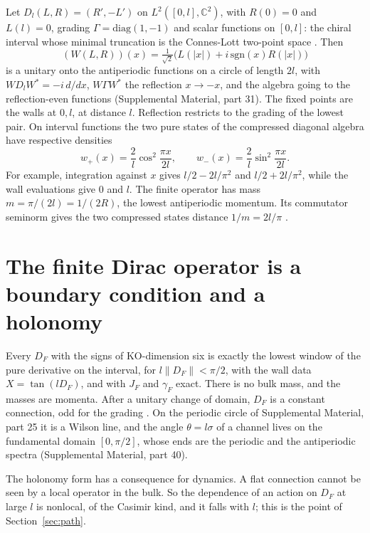 \documentclass[aps,prd,reprint,onecolumn,nofootinbib,amsmath,amssymb,floatfix]{revtex4-2}
\theoremstyle{plain}
\newcommand{\C}{\mathbb C}
\newcommand{\supp}[1]{Supplemental Material, part #1}
\begin{document}
Let $D_l(L,R)=(R',-L')$ on $L^2([0,l],\C^2)$, with $R(0)=0$ and $L(l)=0$, grading $\Gamma=\mathrm{diag}(1,-1)$ and scalar functions on $[0,l]$: the chiral interval whose minimal truncation is the Connes-Lott two-point space \cite{ConnesLott1991}. Then
\begin{equation}
(W(L,R))(x)=\tfrac1{\sqrt2}\bigl(L(|x|)+i\,\mathrm{sgn}(x)R(|x|)\bigr)
\end{equation}
is a unitary onto the antiperiodic functions on a circle of length $2l$, with $WD_lW^*=-i\,d/dx$, $W\Gamma W^*$ the reflection $x\to-x$, and the algebra going to the reflection-even functions (\supp{31}). The fixed points are the walls at $0,l$, at distance $l$. Reflection restricts to the grading of the lowest pair. On interval functions the two pure states of the compressed diagonal algebra have respective densities
\begin{equation}
 w_+(x)=\frac2l\cos^2\frac{\pi x}{2l},\qquad
 w_-(x)=\frac2l\sin^2\frac{\pi x}{2l}.
\end{equation}
For example, integration against $x$ gives $l/2-2l/\pi^2$ and $l/2+2l/\pi^2$, while the wall evaluations give $0$ and $l$. The finite operator has mass $m=\pi/(2l)=1/(2R)$, the lowest antiperiodic momentum. Its commutator seminorm gives the two compressed states distance $1/m=2l/\pi$ \cite{towerlesspaper}.

\section{The finite Dirac operator is a boundary condition and a holonomy}

Every $D_F$ with the signs of KO-dimension six is exactly the lowest window of the pure derivative on the interval, for $l\|D_F\|<\pi/2$, with the wall data $X=\tan(lD_F)$, and with $J_F$ and $\gamma_F$ exact. There is no bulk mass, and the masses are momenta. After a unitary change of domain, $D_F$ is a constant connection, odd for the grading \cite{boundarynote}. On the periodic circle of \supp{25} it is a Wilson line, and the angle $\theta=l\sigma$ of a channel lives on the fundamental domain $[0,\pi/2]$, whose ends are the periodic and the antiperiodic spectra (\supp{40}).

The holonomy form has a consequence for dynamics. A flat connection cannot be seen by a local operator in the bulk. So the dependence of an action on $D_F$ at large $l$ is nonlocal, of the Casimir kind, and it falls with $l$; this is the point of Section~\ref{sec:path}.
\end{document}
